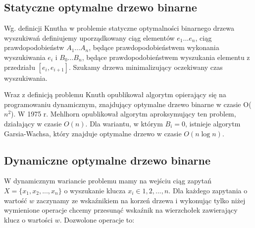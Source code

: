 \documentclass[declaration,shortabstract]{iithesis}
\theoremstyle{thm}
\theoremstyle{remark}
\theoremstyle{plain}
\theoremstyle{plain}
\theoremstyle{plain}
\begin{document}
\subsection{Statyczne optymalne drzewo binarne}   

Wg. definicji Knutha w problemie statyczne optymalności binarnego drzewa wyszukiwań definiujemy uporządkowany ciąg elementów \(e_1...e_n\), ciąg prawdopodobieństw \(A_1...A_n\), będące prawdopodobieństwem wykonania wyszukiwania \(e_i\) i  \(B_0 … B_n\), będące prawdopodobieństwem wyszukania elementu z przedziału \([e_i, e_{i+1}]\). Szukamy drzewa minimalizujący oczekiwany czas wyszukiwania.   

Wraz z definicją problemu Knuth opublikował algorytm opierający się na programowaniu dynamicznym, znajdujący optymalne drzewo binarne w czasie O(\(n^2\)). W 1975 r. Mehlhorn opublikował algorytm aproksymujący ten problem, działający w czasie \(O(n)\). Dla wariantu, w którym \(B_i = 0\), istnieje algorytm Garsia-Wachsa, który znajduje optymalne drzewo w czasie \(O(n\log n)\).   

\subsection{Dynamiczne optymalne drzewo binarne}   

W dynamicznym wariancie problemu mamy na wejściu ciąg zapytań \(X  = \{x_1,x_2,..., x_n\}\) o wyszukanie klucza \(x_i \in {1, 2, ..., n}\). Dla każdego zapytania o wartość \(w\) zaczynamy ze wskaźnikiem na korzeń drzewa i wykonując tylko niżej wymienione operacje chcemy przesunąć wskaźnik na wierzchołek zawierający klucz o wartości \(w\). Dozwolone operacje to:   
\end{document}
